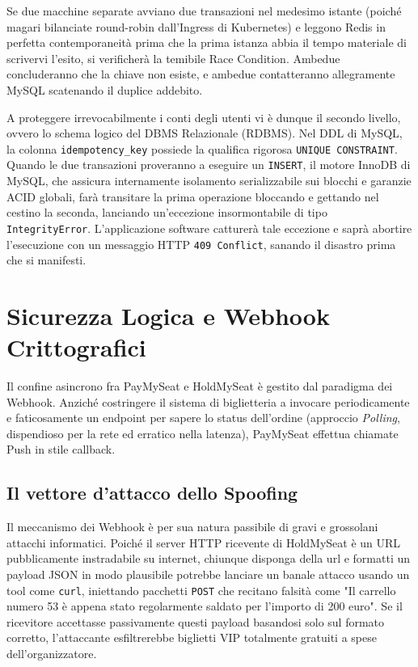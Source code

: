\documentclass[11pt,a4paper]{report}
\begin{document}
Se due macchine separate avviano due transazioni nel medesimo istante (poich\'e magari bilanciate round-robin dall'Ingress di Kubernetes) e leggono Redis in perfetta contemporaneit\`a prima che la prima istanza abbia il tempo materiale di scrivervi l'esito, si verificher\`a la temibile Race Condition. Ambedue concluderanno che la chiave non esiste, e ambedue contatteranno allegramente MySQL scatenando il duplice addebito.

A proteggere irrevocabilmente i conti degli utenti vi \`e dunque il secondo livello, ovvero lo schema logico del DBMS Relazionale (RDBMS). 
Nel DDL di MySQL, la colonna \texttt{idempotency\_key} possiede la qualifica rigorosa \texttt{UNIQUE CONSTRAINT}. Quando le due transazioni proveranno a eseguire un \texttt{INSERT}, il motore InnoDB di MySQL, che assicura internamente isolamento serializzabile sui blocchi e garanzie ACID globali, far\`a transitare la prima operazione bloccando e gettando nel cestino la seconda, lanciando un'eccezione insormontabile di tipo \texttt{IntegrityError}. L'applicazione software catturer\`a tale eccezione e sapr\`a abortire l'esecuzione con un messaggio HTTP \texttt{409 Conflict}, sanando il disastro prima che si manifesti.


\chapter{Sicurezza Logica e Webhook Crittografici}

Il confine asincrono fra PayMySeat e HoldMySeat \`e gestito dal paradigma dei Webhook. Anzich\'e costringere il sistema di biglietteria a invocare periodicamente e faticosamente un endpoint per sapere lo status dell'ordine (approccio \textit{Polling}, dispendioso per la rete ed erratico nella latenza), PayMySeat effettua chiamate Push in stile callback.

\section{Il vettore d'attacco dello Spoofing}
Il meccanismo dei Webhook \`e per sua natura passibile di gravi e grossolani attacchi informatici. Poich\'e il server HTTP ricevente di HoldMySeat \`e un URL pubblicamente instradabile su internet, chiunque disponga della url e formatti un payload JSON in modo plausibile potrebbe lanciare un banale attacco usando un tool come \texttt{curl}, iniettando pacchetti \texttt{POST} che recitano falsit\`a come "Il carrello numero 53 \`e appena stato regolarmente saldato per l'importo di 200 euro". Se il ricevitore accettasse passivamente questi payload basandosi solo sul formato corretto, l'attaccante esfiltrerebbe biglietti VIP totalmente gratuiti a spese dell'organizzatore.
\end{document}
